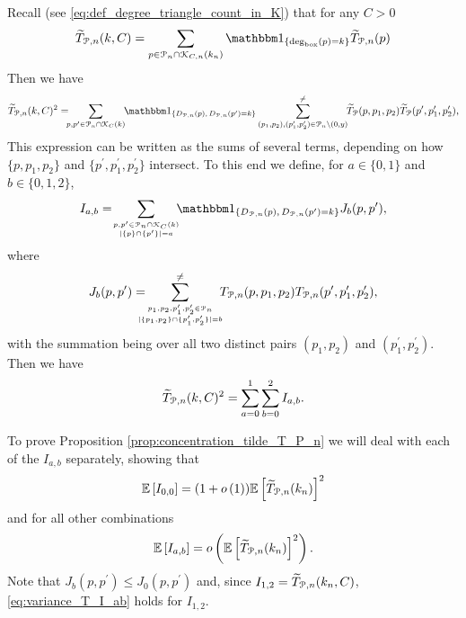 Recall (see \eqref{eq:def_degree_triangle_count_in_K}) that for any $C > 0$
\[
	\widetilde{T}_{\Pcal,n}(k,C) = \sum_{p \in \Pcal_n \cap \Kcal_{C,n}(k_n)} \ind{\text{deg}_{\text{box}}(p) = k} \widetilde{T}_{\Pcal,n}(p)
\]
Then we have
\[
	\widetilde{T}_{\Pcal,n}(k,C)^2 = \hspace{-5pt} \sum_{p, p^\prime \in \Pcal_n \cap \Kcal_C(k)}
		\hspace{-3pt} \ind{D_{\Pcal,n}(p), \, D_{\Pcal,n}(p^\prime) = k} 
		\sum_{(p_1, p_2), (p_1^\prime, p_2^\prime) \in \Pcal_n \setminus (0,y)}^{\ne} \hspace{-3pt}
		\widetilde{T}_{\Pcal}(p,p_1,p_2) \widetilde{T}_{\Pcal}(p^\prime, p_1^\prime, p_2^\prime),
\]
This expression can be written as the sums of several terms, depending on how $\{p, p_1, p_2\}$ and $\{p^\prime, p_1^\prime, p_2^\prime\}$ intersect. To this end we define, for $a \in \{0,1\}$ and $b \in \{0,1,2\}$,
\[
	I_{a,b} = \hspace{-3pt} \sum_{p, p^\prime \in \Pcal_n \cap \Kcal_C(k) \atop |\{p\} \cap \{p^\prime\}| = a}
	\hspace{-5pt} \ind{D_{\Pcal,n}(p), \, D_{\Pcal,n}(p^\prime) = k} J_b(p,p^\prime),
\]
where
\[
	J_b(p,p^\prime) = \hspace{-10pt} \sum_{p_1, p_2, p_1^\prime, p_2^\prime \in \Pcal_n 
		\atop |\{p_1, p_2\} \cap \{p_1^\prime, p_2^\prime\}| = b}^{\ne}
		\hspace{-5pt} T_{\Pcal,n}(p,p_1,p_2) T_{\Pcal,n}(p^\prime, p_1^\prime, p_2^\prime),
\]
with the summation being over all two distinct pairs $(p_1, p_2)$ and $(p_1^\prime, p_2^\prime)$. Then we have
\[
	\widetilde{T}_{{\mathcal P},n}(k, C)^2 = \sum_{a = 0}^1 \sum_{b = 0}^2 I_{a,b}.
\]

To prove Proposition \ref{prop:concentration_tilde_T_P_n} we will deal with each of the $I_{a,b}$ separately, showing that 
\begin{equation}\label{eq:variance_T_I_00}
	\mathbb{E}\left[I_{0,0}\right] = (1+o\left(1\right))\mathbb{E}\left[\widetilde{T}_{{\mathcal P},n}(k_n)\right]^2
\end{equation}
and for all other combinations
\begin{equation}\label{eq:variance_T_I_ab}
	\mathbb{E}\left[I_{a,b}\right] = o\left(\mathbb{E}\left[\widetilde{T}_{{\mathcal P},n}(k_n)\right]^2\right).
\end{equation}
Note that $J_{b}(p,p^\prime) \le J_{0}(p,p^\prime)$ and, since $I_{1,2} = \widetilde{T}_{{\mathcal P},n}(k_n,C)$, \eqref{eq:variance_T_I_ab} holds for $I_{1,2}$. 


